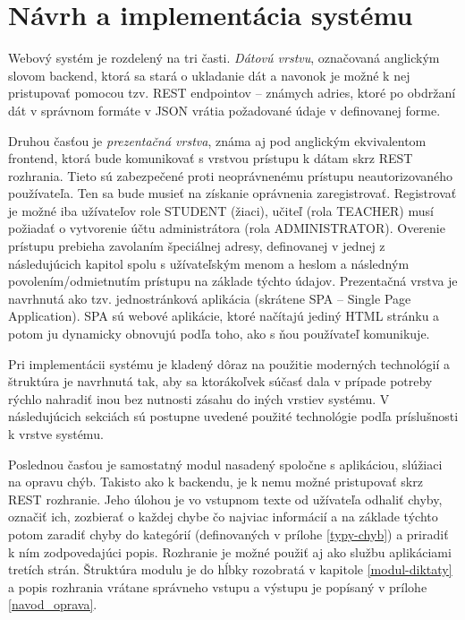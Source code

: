 \documentclass[12pt,oneside]{fithesis2}
\begin{document}
    \chapter{Návrh a implementácia systému}
    
    \par Webový systém je rozdelený na tri časti. \textit{Dátovú vrstvu}, označovaná anglickým slovom backend, ktorá sa stará o ukladanie dát a navonok je možné k nej pristupovať pomocou tzv. REST endpointov – známych adries, ktoré po obdržaní dát v správnom formáte v JSON vrátia požadované údaje v definovanej forme.
	\par Druhou časťou je \textit{prezentačná vrstva}, známa aj pod anglickým ekvivalentom frontend, ktorá bude komunikovať s vrstvou prístupu k dátam skrz REST rozhrania. Tieto sú zabezpečené proti neoprávnenému prístupu neautorizovaného používateľa. Ten sa bude musieť na získanie oprávnenia zaregistrovať. Registrovať je možné iba užívateľov role STUDENT (žiaci), učiteľ (rola TEACHER) musí požiadať o vytvorenie účtu administrátora (rola ADMINISTRATOR). Overenie prístupu prebieha zavolaním špeciálnej adresy, definovanej v jednej z následujúcich kapitol spolu s užívateľským menom a heslom a následným povolením/odmietnutím prístupu na základe týchto údajov. Prezentačná vrstva je navrhnutá ako tzv. jednostránková aplikácia (skrátene SPA -- Single Page Application). SPA sú webové aplikácie, ktoré načítajú jediný HTML stránku a potom ju dynamicky obnovujú podľa toho, ako s ňou používateľ komunikuje\cite{wasson13}.
	    \par Pri implementácii systému je kladený dôraz na použitie moderných technológií a štruktúra je navrhnutá tak, aby sa ktorákoľvek súčasť dala v prípade potreby rýchlo nahradiť inou bez nutnosti zásahu do iných vrstiev systému. V následujúcich sekciách sú postupne uvedené použité technológie podľa príslušnosti k vrstve systému.
	    \par Poslednou časťou je samostatný modul nasadený spoločne s aplikáciou, slúžiaci na opravu chýb. Takisto ako k backendu, je k nemu možné pristupovať skrz REST rozhranie. Jeho úlohou je vo vstupnom texte od užívateľa odhaliť chyby, označiť ich, zozbierať o každej chybe čo najviac informácií a na základe týchto potom zaradiť chyby do kategórií (definovaných v prílohe \ref{typy-chyb}) a priradiť k ním zodpovedajúci popis. Rozhranie je možné použiť aj ako službu aplikáciami tretích strán. Štruktúra modulu je do hĺbky rozobratá v kapitole \ref{modul-diktaty} a popis rozhrania vrátane správneho vstupu a výstupu je popísaný v prílohe \ref{navod_oprava}.
	\pagebreak
	
\end{document}
